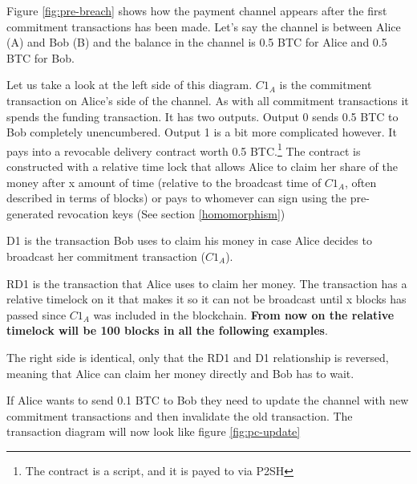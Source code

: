Figure \ref{fig:pre-breach} shows how the payment channel appears after the first commitment transactions has been made. Let's say the channel is between Alice (A) and Bob (B) and the balance in the channel is 0.5 BTC for Alice and 0.5 BTC for Bob. 

Let us take a look at the left side of this diagram. \textbf{$C1_{A}$} is the commitment transaction on Alice's side of the channel. As with all commitment transactions it spends the funding transaction. It has two outputs. Output 0 sends 0.5 BTC to Bob completely unencumbered. Output 1 is a bit more complicated however. It pays into a revocable delivery contract worth 0.5 BTC.\footnote{The contract is a script, and it is payed to via P2SH} The contract is constructed with a relative time lock that allows Alice to claim her share of the money after x amount of time (relative to the broadcast time of $C1_{A}$, often described in terms of blocks) or pays to whomever can sign using the pre-generated revocation keys (See section \ref{homomorphism})

D1 is the transaction Bob uses to claim his money in case Alice decides to broadcast her commitment transaction ($C1_{A}$).

RD1 is the transaction that Alice uses to claim her money. The transaction has a relative timelock on it that makes it so it can not be broadcast until x blocks has passed since $C1_{A}$ was included in the blockchain. \textbf{From now on the relative timelock will be 100 blocks in all the following examples}.

The right side is identical, only that the RD1 and D1 relationship is reversed, meaning that Alice can claim her money directly and Bob has to wait. 

If Alice wants to send 0.1 BTC to Bob they need to update the channel with new commitment transactions and then invalidate the old transaction. The transaction diagram will now look like figure \ref{fig:pc-update}

